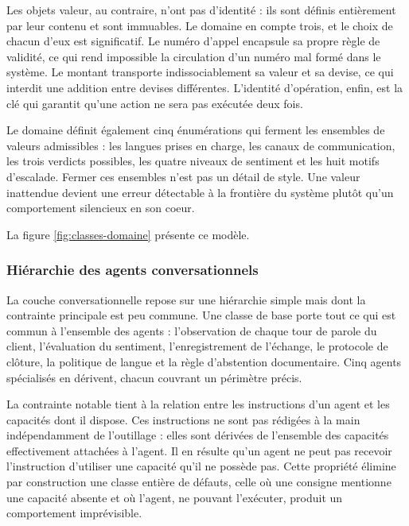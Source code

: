 Les objets valeur, au contraire, n'ont pas d'identité : ils sont définis entièrement par leur contenu et sont immuables. Le domaine en compte trois, et le choix de chacun d'eux est significatif. Le numéro d'appel encapsule sa propre règle de validité, ce qui rend impossible la circulation d'un numéro mal formé dans le système. Le montant transporte indissociablement sa valeur et sa devise, ce qui interdit une addition entre devises différentes. L'identité d'opération, enfin, est la clé qui garantit qu'une action ne sera pas exécutée deux fois.

Le domaine définit également cinq énumérations qui ferment les ensembles de valeurs admissibles : les langues prises en charge, les canaux de communication, les trois verdicts possibles, les quatre niveaux de sentiment et les huit motifs d'escalade. Fermer ces ensembles n'est pas un détail de style. Une valeur inattendue devient une erreur détectable à la frontière du système plutôt qu'un comportement silencieux en son coeur.

La figure \ref{fig:classes-domaine} présente ce modèle.


\subsubsection{Hiérarchie des agents conversationnels}

La couche conversationnelle repose sur une hiérarchie simple mais dont la contrainte principale est peu commune. Une classe de base porte tout ce qui est commun à l'ensemble des agents : l'observation de chaque tour de parole du client, l'évaluation du sentiment, l'enregistrement de l'échange, le protocole de clôture, la politique de langue et la règle d'abstention documentaire. Cinq agents spécialisés en dérivent, chacun couvrant un périmètre précis.

La contrainte notable tient à la relation entre les instructions d'un agent et les capacités dont il dispose. Ces instructions ne sont pas rédigées à la main indépendamment de l'outillage : elles sont dérivées de l'ensemble des capacités effectivement attachées à l'agent. Il en résulte qu'un agent ne peut pas recevoir l'instruction d'utiliser une capacité qu'il ne possède pas. Cette propriété élimine par construction une classe entière de défauts, celle où une consigne mentionne une capacité absente et où l'agent, ne pouvant l'exécuter, produit un comportement imprévisible.

